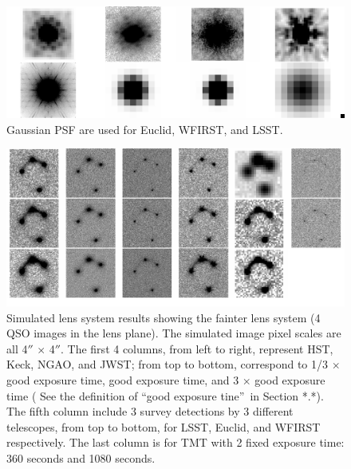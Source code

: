 \documentclass[a4paper,11pt]{article}
\begin{document}
\begin{figure}
\begin{center}
\includegraphics[width=1.0\textwidth]{figures/PSF_montage.png}
\end{center}
\caption{Gaussian PSF are used for Euclid, WFIRST, and LSST.}
\label{fig:PSF_montage}
\end{figure}



\begin{figure}
\begin{center}
\includegraphics[width=1.0\textwidth]{figures/fainter_system_4QSOimages_all.png}
\end{center}
\caption{Simulated lens system results showing the fainter lens system (4 QSO images in the lens plane). The simulated image pixel scales are all 4$''$ $\times$ 4$''$. The first 4 columns, from left to right, represent HST, Keck, NGAO, and JWST; from top to bottom, correspond to 1/3 $\times$ good exposure time, good exposure time, and 3 $\times$ good exposure time ( See the definition of \textquotedblleft good exposure tine\textquotedblright\ in Section *.*). The fifth column include 3 survey detections by 3 different telescopes, from top to bottom, for LSST, Euclid, and WFIRST respectively. The last column is for TMT with 2 fixed exposure time: 360 seconds and 1080 seconds.}
\label{fig:fainter_4QSOimages_montage}
\end{figure}
\end{document}
